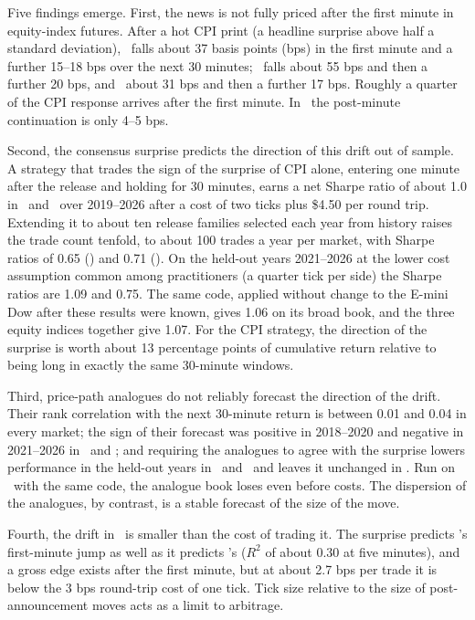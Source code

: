Five findings emerge. First, the news is not fully priced after the first minute in equity-index
futures. After a hot CPI print (a headline surprise above half a standard deviation), \ES\ falls
about 37 basis points (bps) in the first minute and a further 15--18 bps over the next 30 minutes;
\NQ\ falls about 55 bps and then a further 20 bps, and \YM\ about 31 bps and then a further 17
bps. Roughly a quarter of the CPI response arrives
after the first minute. In \ZN\ the post-minute continuation is only 4--5 bps.

Second, the consensus surprise predicts the direction of this drift out of sample. A strategy
that trades the sign of the surprise of CPI alone, entering one minute after the release and
holding for 30 minutes, earns a net Sharpe ratio of about 1.0 in \ES\ and \NQ\ over 2019--2026
after a cost of two ticks plus \$4.50 per round trip. Extending it to about ten release families
selected each year from history raises the trade count tenfold, to about 100 trades a year per
market, with Sharpe ratios of 0.65 (\ES) and 0.71 (\NQ). On the held-out years 2021--2026 at the
lower cost assumption common among practitioners (a quarter tick per side) the Sharpe ratios are
1.09 and 0.75. The same code, applied without change to the E-mini Dow after these results were
known, gives 1.06 on its broad book, and the three equity indices together give 1.07. For the CPI strategy, the direction of the surprise is worth about 13 percentage
points of cumulative return relative to being long in exactly the same 30-minute windows.

Third, price-path analogues do not reliably forecast the direction of the drift. Their rank correlation
with the next 30-minute return is between 0.01 and 0.04 in every market; the sign of their
forecast was positive in 2018--2020 and negative in 2021--2026 in \ES\ and \NQ; and requiring the
analogues to agree with the surprise lowers performance in the held-out years in \ES\ and \NQ\ and
leaves it unchanged in \YM. Run on \YM\ with the same code, the
analogue book loses even before costs. The dispersion of the analogues,
by contrast, is a stable forecast of the size of the move.

Fourth, the drift in \ZN\ is smaller than the cost of trading it. The surprise predicts \ZN's
first-minute jump as well as it predicts \ES's ($R^2$ of about 0.30 at five minutes), and a gross
edge exists after the first minute, but at about 2.7 bps per trade it is below the 3 bps round-trip
cost of one tick. Tick size relative to the size of post-announcement moves acts as a limit to
arbitrage.

